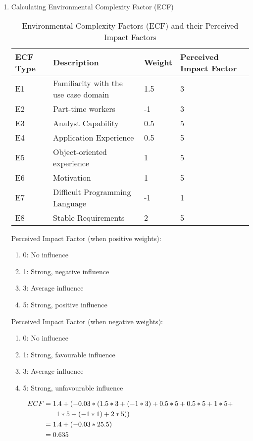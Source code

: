 \begin{enumerate}
\item {Calculating Environmental Complexity Factor (ECF)}

\begin{table}[!thb]
\begin{tabularx}{\textwidth}{|l|X|l|l|}
\hline
\textbf{ECF Type} & \textbf{Description} & \textbf{Weight} & \textbf{Perceived Impact Factor} \\
\hline
E1 & Familiarity with the use case domain                 & 1.5 & 3\\\hline
E2 & Part-time workers   & -1 & 3\\\hline
E3 & Analyst Capability & 0.5 & 5\\\hline
E4 & Application Experience                     & 0.5 & 5\\\hline
E5 & Object-oriented experience     & 1 & 5\\\hline
E6 & Motivation & 1 & 5\\\hline
E7 & Difficult Programming Language & -1 & 1\\\hline
E8 & Stable Requirements & 2 & 5\\\hline
\end{tabularx}
\caption{Environmental Complexity Factors (ECF) and their Perceived Impact Factors}
\end{table}

\vspace{8pt}
Perceived Impact Factor (when positive weights):
\begin{enumerate}
    \item 0: No influence
    \item 1: Strong, negative influence
    \item 3: Average influence
    \item 5: Strong, positive influence
\end{enumerate}
Perceived Impact Factor (when negative weights):
\begin{enumerate}
    \item 0: No influence
    \item 1: Strong, favourable influence
    \item 3: Average influence
    \item 5: Strong, unfavourable influence
\end{enumerate}

\begin{align}
    ECF     &= 1.4 + (-0.03 * (1.5*3 + (-1*3) + 0.5*5 + 0.5*5 + 1*5 + \\
            &\phantom{{}=1}1*5 + (-1*1) + 2*5))  \notag\\
            &= 1.4 + (-0.03 * 25.5) \\        
            &= 0.635
\end{align}



\end{enumerate}
